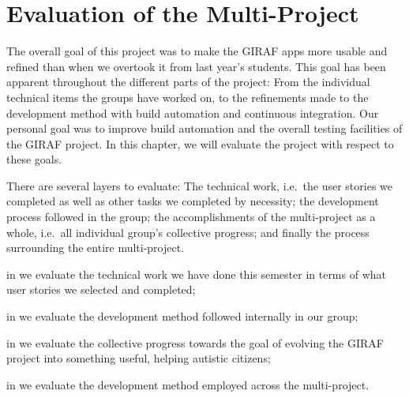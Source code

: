 \chapter{Evaluation of the Multi-Project}\label{chap:evaluation}
The overall goal of this project was to make the GIRAF apps more usable and refined than when we overtook it from last year's students. This goal has been apparent throughout the different parts of the project: From the individual technical items the groups have worked on, to the refinements made to the development method with build automation and continuous integration. Our personal goal was to improve build automation and the overall testing facilities of the GIRAF project. In this chapter, we will evaluate the project with respect to these goals.

There are several layers to evaluate: The technical work, i.e.\ the user stories we completed as well as other tasks we completed by necessity; the development process followed in the group; the accomplishments of the multi-project as a whole, i.e.\ all individual group's collective progress; and finally the process surrounding the entire multi-project. 

\begin{chapterorganization}
  \item in  we evaluate the technical work we have done this semester in terms of what user stories we selected and completed;
  \item in  we evaluate the development method followed internally in our group;
  \item in  we evaluate the collective progress towards the goal of evolving the GIRAF project into something useful, helping autistic citizens;
  \item in  we evaluate the development method employed across the multi-project.
\end{chapterorganization}

